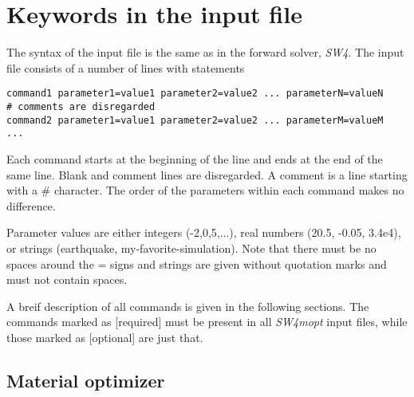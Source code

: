 \documentclass[12pt]{report}
\begin{document}
\chapter{Keywords in the input file}\label{chap:keywords}
The syntax of the input file is the same as in the forward solver, \emph{SW4}. The input
file consists of a number of lines with statements
\begin{verbatim}
command1 parameter1=value1 parameter2=value2 ... parameterN=valueN
# comments are disregarded
command2 parameter1=value1 parameter2=value2 ... parameterM=valueM
...
\end{verbatim}
Each command starts at the beginning of the line and ends at the end of the same line. Blank and
comment lines are disregarded. A comment is a line starting with a \# character. The order of the
parameters within each command makes no difference. 

Parameter values are either integers (-2,0,5,...), real numbers (20.5, -0.05, 3.4e4), or strings
(earthquake, my-favorite-simulation). Note that there must be no spaces around the = signs and
strings are given without quotation marks and must not contain spaces. 

A breif description of all commands is given in the following sections. The commands marked as
[required] must be present in all \emph{SW4mopt} input files, while those marked as [optional] are just
that. 

\section{Material optimizer}
\end{document}

